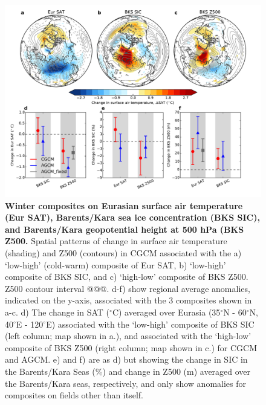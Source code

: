 \documentclass{nature}
\begin{document}
\begin{figure}%
\centering
\noindent\includegraphics[width=39pc]{Word/Figure_5.pdf}
\caption{\textbf{Winter composites on Eurasian surface air temperature (Eur SAT), Barents/Kara sea ice concentration (BKS SIC), and Barents/Kara geopotential height at 500 hPa (BKS Z500.} Spatial patterns of change in surface air temperature (shading) and Z500 (contours) in CGCM associated with the a) `low-high' (cold-warm) composite of Eur SAT, b) `low-high' composite of BKS SIC, and c) `high-low' composite of BKS Z500. Z500 contour interval @@@. d-f) show regional average anomalies, indicated on the y-axis, associated with the 3 composites shown in a-c. d) The change in SAT ($^\circ$C) averaged over Eurasia (35$^\circ$N - 60$^\circ$N, 40$^\circ$E - 120$^\circ$E) associated with the `low-high' composite of BKS SIC (left column; map shown in a.), and associated with the `high-low' composite of BKS Z500 (right column; map shown in c.) for CGCM and AGCM. e) and f) are as d) but showing the change in SIC in the Barents/Kara Seas (\%) and change in Z500 (m) averaged over the Barents/Kara seas, respectively, and only show anomalies for composites on fields other than itself.
}
\label{fig:fig5} 
\end{figure}

\end{document}
